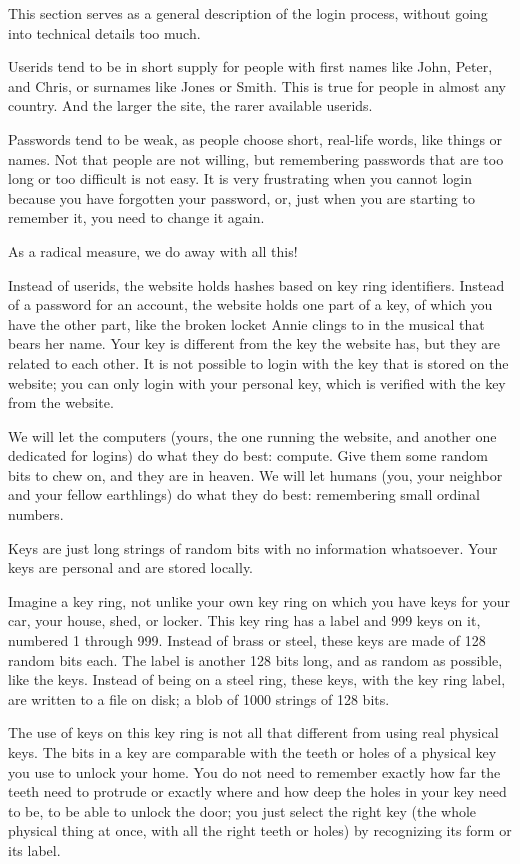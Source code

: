 This section serves as a general description of the login process,
without going into technical details too much.

Userids tend to be in short supply for people with first names like John, Peter, and Chris,
or surnames like Jones or Smith.
This is true for people in almost any country.
And the larger the site, the rarer available userids.
\par
Passwords tend to be weak,
as people choose short, real-life words, like things or names.
Not that people are not willing, but remembering passwords that are too long or too difficult is not easy.
It is very frustrating when you cannot login because you have forgotten your password,
or,
just when you are starting to remember it,
you need to change it again.
\par
As a radical measure, we do away with all this!
\par
Instead of userids, the website holds hashes based on key ring identifiers.
Instead of a password for an account, the website holds one part of a key, of which you have the other part,
like the broken locket Annie clings to in the musical that bears her name.
Your key is different from the key the website has, but they are related to each other.
It is not possible to login with the key that is stored on the website;
you can only login with your personal key, which is verified with the key from the website.
\par
We will let the computers
(yours, the one running the website, and another one dedicated for logins)
do what they do best: compute.
Give them some random bits to chew on, and they are in heaven.
We will let humans (you, your neighbor and your fellow earthlings) do what they do best:
remembering small ordinal numbers.

Keys are just long strings of random bits with no information whatsoever.
Your keys are personal and are stored locally.
\par
Imagine a key ring,
	not unlike your own key ring on which you have keys for your car,
		your house,
			shed,
				or locker.
This key ring has a label and 999 keys on it,
	numbered 1 through 999.
Instead of brass or steel,
	these keys are made of 128 random bits each.
The label is another 128 bits long,
	and as random as possible,
		like the keys.
Instead of being on a steel ring,
	these keys,
		with the key ring label,
			are written to a file on disk;
				a blob of 1000 strings of 128 bits.
\par
The use of keys on this key ring is not all that different from using real physical keys.
The bits in a key are comparable with the teeth or holes of a physical key you use to unlock your home.
You do not need to remember exactly how far the teeth need to protrude or exactly where and how deep the holes in your key need to be,
	to be able to unlock the door;
		you just select the right key
			(the whole physical thing at once, with all the right teeth or holes)
				by recognizing its form or its label.


